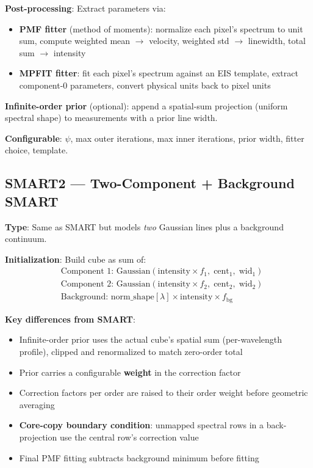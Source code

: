 \documentclass[11pt,a4paper]{article}
\begin{document}
\textbf{Post-processing}: Extract parameters via:
\begin{itemize}[nosep]
  \item \textbf{PMF fitter} (method of moments): normalize each pixel's spectrum to unit sum, compute weighted mean $\rightarrow$ velocity, weighted std $\rightarrow$ linewidth, total sum $\rightarrow$ intensity
  \item \textbf{MPFIT fitter}: fit each pixel's spectrum against an EIS template, extract component-0 parameters, convert physical units back to pixel units
\end{itemize}

\textbf{Infinite-order prior} (optional): append a spatial-sum projection (uniform spectral shape) to measurements with a prior line width.

\smallskip
\textbf{Configurable}: $\psi$, max outer iterations, max inner iterations, prior width, fitter choice, template.

\subsection{SMART2 --- Two-Component + Background SMART}
\textbf{Type}: Same as SMART but models \emph{two} Gaussian lines plus a background continuum.

\smallskip
\textbf{Initialization}: Build cube as sum of:
\begin{align*}
  &\text{Component 1: } \text{Gaussian}(\text{intensity} \times f_1,\; \text{cent}_1,\; \text{wid}_1) \\
  &\text{Component 2: } \text{Gaussian}(\text{intensity} \times f_2,\; \text{cent}_2,\; \text{wid}_2) \\
  &\text{Background: } \text{norm\_shape}[\lambda] \times \text{intensity} \times f_{\text{bg}}
\end{align*}

\textbf{Key differences from SMART}:
\begin{itemize}[nosep]
  \item Infinite-order prior uses the actual cube's spatial sum (per-wavelength profile), clipped and renormalized to match zero-order total
  \item Prior carries a configurable \textbf{weight} in the correction factor
  \item Correction factors per order are raised to their order weight before geometric averaging
  \item \textbf{Core-copy boundary condition}: unmapped spectral rows in a back-projection use the central row's correction value
  \item Final PMF fitting subtracts background minimum before fitting
\end{itemize}
\end{document}
